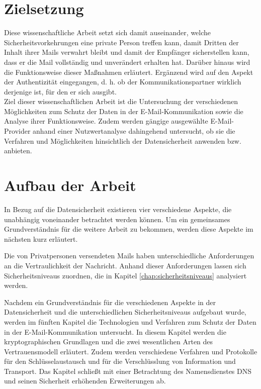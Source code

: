 \documentclass  [paper=a4,
				fontsize=12pt,
				listof=totoc,
				bibliography=totoc
				]{scrreprt}
\begin{document}
		\section{Zielsetzung}
		Diese wissenschaftliche Arbeit setzt sich damit auseinander, welche Sicherheitsvorkehrungen eine private Person treffen kann, damit Dritten der Inhalt ihrer Mails verwahrt bleibt und damit der Empfänger sicherstellen kann, dass er die Mail vollständig und unverändert erhalten hat. Darüber hinaus wird die Funktionsweise dieser Maßnahmen erläutert. Ergänzend wird auf den Aspekt der Authentizität eingegangen, d. h. ob der Kommunikationspartner wirklich derjenige ist, für den er sich ausgibt. \\
		
	
		Ziel dieser wissenschaftlichen Arbeit ist die Untersuchung der verschiedenen Möglichkeiten zum Schutz der Daten in der E-Mail-Kommunikation sowie die Analyse ihrer Funktionsweise. Zudem werden gängige ausgewählte E-Mail-Provider anhand einer Nutzwertanalyse dahingehend untersucht, ob sie die Verfahren und Möglichkeiten hinsichtlich der Datensicherheit anwenden bzw. anbieten.
		
		\section{Aufbau der Arbeit}
		
		In Bezug auf die Datensicherheit existieren vier verschiedene Aspekte, die unabhängig voneinander betrachtet werden können. Um ein gemeinsames Grundverständnis für die weitere Arbeit zu bekommen, werden diese Aspekte im nächsten kurz erläutert.
		
		Die von Privatpersonen versendeten Mails haben unterschiedliche Anforderungen an die Vertraulichkeit der Nachricht. Anhand dieser Anforderungen lassen sich Sicherheitsniveaus zuordnen, die in Kapitel \ref{chap:sicherheitsniveaus} analysiert werden.
		
		Nachdem ein Grundverständnis für die verschiedenen Aspekte in der Datensicherheit und die unterschiedlichen Sicherheitsniveaus aufgebaut wurde, werden im fünften Kapitel die Technologien und Verfahren zum Schutz der Daten in der E-Mail-Kommunikation untersucht. In diesem Kapitel werden die kryptographischen Grundlagen und die zwei wesentlichen Arten des Vertrauensmodell erläutert. Zudem werden verschiedene Verfahren und Protokolle für den Schlüsselaustausch und für die Verschlüsslung von Information und Transport. Das Kapitel schließt mit einer Betrachtung des 
		Namensdienstes DNS und seinen Sicherheit erhöhenden Erweiterungen ab.
		
\end{document}
